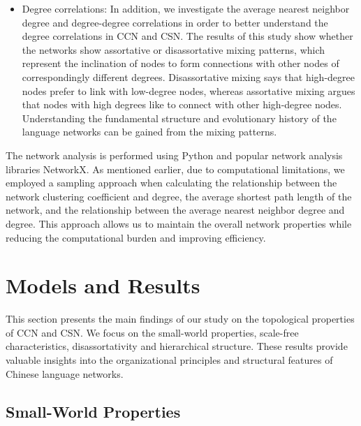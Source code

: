 \documentclass[11pt]{article}
\begin{document}
\begin{itemize}
    \item Degree correlations: In addition, we investigate the average nearest neighbor degree and degree-degree correlations in order to better understand the degree correlations in CCN and CSN. The results of this study show whether the networks show assortative or disassortative mixing patterns, which represent the inclination of nodes to form connections with other nodes of correspondingly different degrees. Disassortative mixing says that high-degree nodes prefer to link with low-degree nodes, whereas assortative mixing argues that nodes with high degrees like to connect with other high-degree nodes. Understanding the fundamental structure and evolutionary history of the language networks can be gained from the mixing patterns.
\end{itemize}
    
The network analysis is performed using Python and popular network analysis libraries NetworkX. As mentioned earlier, due to computational limitations, we employed a sampling approach when calculating the relationship between the network clustering coefficient and degree, the average shortest path length of the network, and the relationship between the average nearest neighbor degree and degree. This approach allows us to maintain the overall network properties while reducing the computational burden and improving efficiency.

\section{Models and Results}
This section presents the main findings of our study on the topological properties of CCN and CSN. We focus on the small-world properties, scale-free characteristics, disassortativity and hierarchical structure. These results provide valuable insights into the organizational principles and structural features of Chinese language networks.
\subsection{Small-World Properties}
\end{document}

